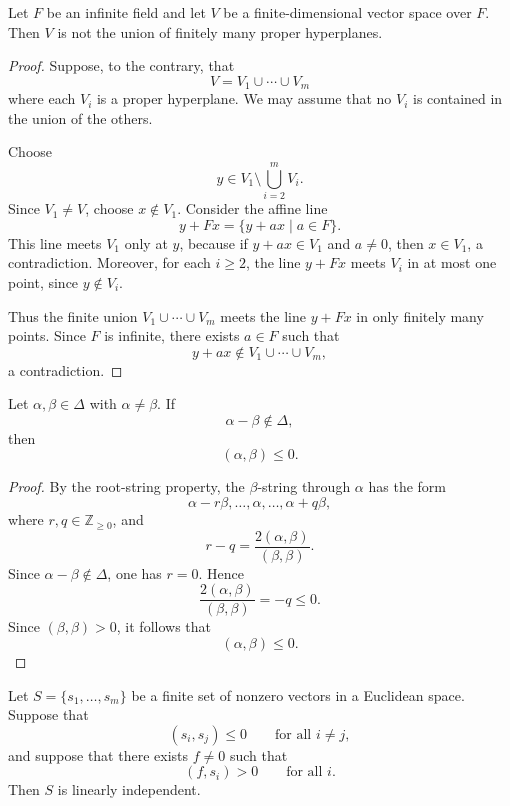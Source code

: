 \begin{lemma}
    Let \(F\) be an infinite field and let \(V\) be a finite-dimensional vector
    space over \(F\). Then \(V\) is not the union of finitely many proper
    hyperplanes.
\end{lemma}

\begin{proof}
    Suppose, to the contrary, that
    \[
        V=V_1\cup\cdots\cup V_m
    \]
    where each \(V_i\) is a proper hyperplane. We may assume that no \(V_i\) is
    contained in the union of the others.

    Choose
    \[
        y\in V_1\setminus \bigcup_{i=2}^m V_i.
    \]
    Since \(V_1\neq V\), choose \(x\notin V_1\). Consider the affine line
    \[
        y+Fx=\{y+ax\mid a\in F\}.
    \]
    This line meets \(V_1\) only at \(y\), because if \(y+ax\in V_1\) and
    \(a\neq 0\), then \(x\in V_1\), a contradiction. Moreover, for each
    \(i\geq 2\), the line \(y+Fx\) meets \(V_i\) in at most one point, since
    \(y\notin V_i\).

    Thus the finite union \(V_1\cup\cdots\cup V_m\) meets the line \(y+Fx\) in
    only finitely many points. Since \(F\) is infinite, there exists \(a\in F\)
    such that
    \[
        y+ax\notin V_1\cup\cdots\cup V_m,
    \]
    a contradiction.
\end{proof}

\begin{lemma}
    Let \(\alpha,\beta\in\Delta\) with \(\alpha\neq\beta\). If
    \[
        \alpha-\beta\notin\Delta,
    \]
    then
    \[
        (\alpha,\beta)\leq 0.
    \]
\end{lemma}

\begin{proof}
    By the root-string property, the \(\beta\)-string through \(\alpha\) has the
    form
    \[
        \alpha-r\beta,\ldots,\alpha,\ldots,\alpha+q\beta,
    \]
    where \(r,q\in\mathbb{Z}_{\geq 0}\), and
    \[
        r-q
        =
        \frac{2(\alpha,\beta)}{(\beta,\beta)}.
    \]
    Since \(\alpha-\beta\notin\Delta\), one has \(r=0\). Hence
    \[
        \frac{2(\alpha,\beta)}{(\beta,\beta)}
        =
        -q
        \leq 0.
    \]
    Since \((\beta,\beta)>0\), it follows that
    \[
        (\alpha,\beta)\leq 0.
    \]
\end{proof}

\begin{lemma}
    Let \(S=\{s_1,\ldots,s_m\}\) be a finite set of nonzero vectors in a
    Euclidean space. Suppose that
    \[
        (s_i,s_j)\leq 0
        \qquad
        \text{for all } i\neq j,
    \]
    and suppose that there exists \(f\neq 0\) such that
    \[
        (f,s_i)>0
        \qquad
        \text{for all } i.
    \]
    Then \(S\) is linearly independent.
\end{lemma}

